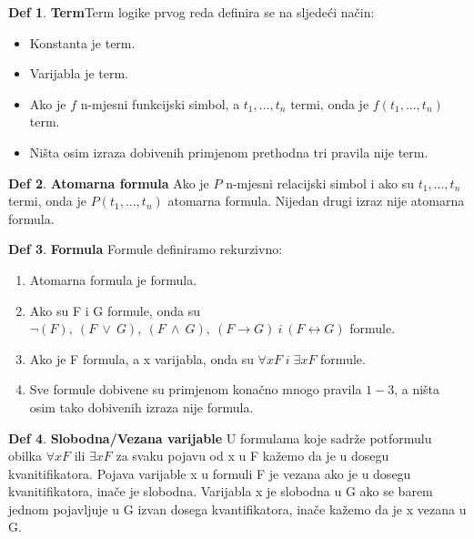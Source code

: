 \documentclass{article}
\theoremstyle{definition}
\newtheorem{definicija}{Def}[section]
\theoremstyle{plain}
\begin{document}
\begin{definicija}
\textbf{Term}\newline Term logike prvog reda definira se na sljedeći način:
\begin{itemize}
    \item Konstanta je term.
    \item Varijabla je term.
    \item Ako je $f$ n-mjesni funkcijski simbol, a $t_1,...,t_n$ termi, onda je $f(t_1,...,t_n)$ term.
    \item Ništa osim izraza dobivenih primjenom prethodna tri pravila nije term.
\end{itemize}
\end{definicija}

\begin{definicija}
    \textbf{Atomarna formula}\newline
    Ako je $P$ n-mjesni relacijski simbol i ako su $t_1,...,t_n$ termi, onda je $P(t_1,...,t_n)$ atomarna formula. Nijedan drugi izraz nije atomarna formula.
\end{definicija}

\begin{definicija}
    \textbf{Formula}\newline
    Formule definiramo rekurzivno:
    \begin{enumerate}
        \item Atomarna formula je formula.
        \item Ako su F i G formule, onda su $\neg (F),\:(F\:\lor\:G),\:(F\:\land\:G),\:(F\rightarrow G)\:i\:(F\leftrightarrow G)$ formule.
        \item Ako je F formula, a x varijabla, onda su $\forall xF\;i\;\exists xF$ formule.
        \item Sve formule dobivene su primjenom konačno mnogo pravila $1-3$, a ništa osim tako dobivenih izraza nije formula.
    \end{enumerate}
\end{definicija}

\begin{definicija}
    \textbf{Slobodna/Vezana varijable}\newline
    U formulama koje sadrže potformulu obilka $\forall xF$ ili $\exists xF$ za svaku pojavu od x u F kažemo da je u dosegu kvanitifikatora. Pojava varijable x u formuli F je vezana ako je u dosegu kvanitifikatora, inače je slobodna. Varijabla x je slobodna u G ako se barem jednom pojavljuje u G izvan dosega kvantifikatora, inače kažemo da je x vezana u G.
\end{definicija}
\end{document}
